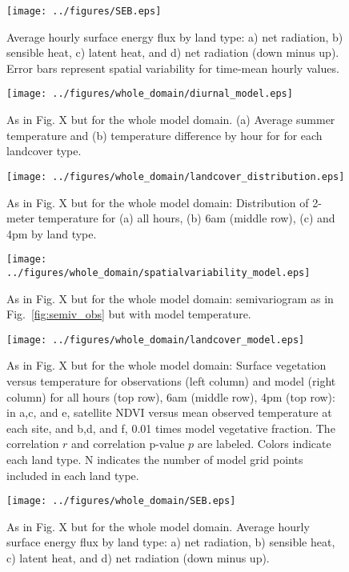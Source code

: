 \documentclass[draft,linenumbers]{agujournal}
\begin{document}
\begin{figure}[h]
\centering
\texttt{[image: ../figures/SEB.eps]}
\caption{Average hourly surface energy flux by land type: a) net radiation, b) sensible heat, c) latent heat, and d) net radiation (down minus up). Error bars represent spatial variability for time-mean hourly values.}
\label{fig:seb}
\end{figure}

\begin{figure}[h]
\centering
\texttt{[image: ../figures/whole\_domain/diurnal\_model.eps]}
\caption{As in Fig. X but for the whole model domain. (a) Average summer temperature and (b) temperature difference by hour for for each landcover type.}%
\label{fig:diurnal_wd}
\end{figure}

\begin{figure}[h]
\centering
\texttt{[image: ../figures/whole\_domain/landcover\_distribution.eps]}
\caption{As in Fig. X but for the whole model domain: Distribution of 2-meter temperature for (a) all hours, (b) 6am (middle row), (c) and 4pm by land type. }
\label{fig:hist_wd}
\end{figure}

\begin{figure}[h]
\centering
\texttt{[image: ../figures/whole\_domain/spatialvariability\_model.eps]}
\caption{As in Fig. X but for the whole model domain: semivariogram as in Fig.~\ref{fig:semiv_obs} but with model temperature.}
\label{fig:semiv_model_wd}
\end{figure}

\begin{figure}[h]
\centering
\texttt{[image: ../figures/whole\_domain/landcover\_model.eps]}
\caption{As in Fig. X but for the whole model domain:  Surface vegetation versus temperature for observations (left column) and model (right column) for all hours (top row), 6am (middle row), 4pm (top row): in a,c, and e, satellite NDVI versus mean observed temperature at each site, and b,d, and f, 0.01 times model vegetative fraction. The correlation $r$ and correlation p-value $p$ are labeled. Colors indicate each land type. N indicates the number of model grid points included in each land type.}
\label{fig:veg_wd}
\end{figure}

\begin{figure}[h]
\centering
\texttt{[image: ../figures/whole\_domain/SEB.eps]}
\caption{As in Fig. X but for the whole model domain. Average hourly surface energy flux by land type: a) net radiation, b) sensible heat, c) latent heat, and d) net radiation (down minus up).}
\label{fig:seb_wd}
\end{figure}
\end{document}

